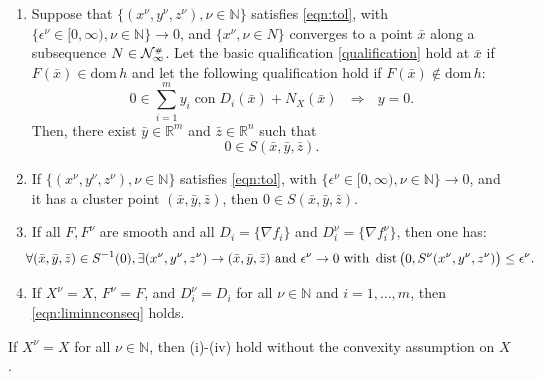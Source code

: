 \documentclass[smallextended,envcountsect]{svjour3}
\newcommand{\dom}[1]{\mathrm{dom}\, #1} %
\newcommand{\nats}{\mathbb{N}}
\newcommand{\reals}{\mathbb{R}}
\newcommand{\cN}{{\cal N}}
\newcommand{\grill}{{\scriptscriptstyle\#}}
\DeclareMathOperator{\con}{con}
\DeclareMathOperator{\dist}{dist}
\begin{document}
\begin{theorem}
\begin{enumerate}[label=(\roman*), start=1]
\item  Suppose that $\{(x^\nu,y^\nu,z^\nu), \nu\in\nats\}$ satisfies \eqref{eqn:tol}, with $\{\epsilon^\nu \in [0,\infty), \nu\in\nats\} \to 0$, and $\{x^\nu, \nu\in N\}$ converges to a point $\bar x$ along a subsequence $N\in \cN_\infty^\grill$. Let the basic qualification \eqref{qualification} hold at $\bar x$ if $F(\bar x) \in \dom h$ and let the following qualification hold if $F(\bar x) \not\in \dom h$: 
\begin{equation}\label{qualificationInfeas}
0 \in \sum_{i=1}^m y_i \con D_i(\bar x) + N_X(\bar x)~~~\Longrightarrow~~~ y=0.
\end{equation}
Then, there exist $\bar y\in\reals^m$ and $\bar z\in \reals^n$ such that 
\[
0 \in S(\bar x, \bar y, \bar z).
\]

\item If $\{(x^\nu,y^\nu,z^\nu), \nu\in\nats\}$ satisfies \eqref{eqn:tol}, with $\{\epsilon^\nu \in [0,\infty), \nu\in\nats\} \to 0$, and it has a cluster point $(\bar x, \bar y, \bar z)$, then $0 \in S(\bar x, \bar y, \bar z)$. 


\item  If all $F,F^\nu$ are smooth and all $D_i = \{\nabla f_i\}$ and $D^\nu_i= \{\nabla f_i^\nu\}$, then one has: 
\begin{equation}\label{eqn:liminnconseq}
\hspace{-0.2cm}\forall  (\bar x, \bar y, \bar z) \in S^{-1}(0), \exists (x^\nu,y^\nu,z^\nu) \to (\bar x, \bar y, \bar z) \mbox{ and } \epsilon^\nu\to 0 \mbox{ with } \dist\big(0, S^\nu(x^\nu,y^\nu,z^\nu)\big) \leq \epsilon^\nu. 
\end{equation}

\item If $X^\nu = X$, $F^\nu = F$, and $D_i^\nu = D_i$ for all $\nu\in\nats$ and $i = 1, \dots, m$, then \eqref{eqn:liminnconseq} holds.  
%
\end{enumerate}
If $X^\nu = X$ for all $\nu\in \nats$, then (i)-(iv) hold without the convexity assumption on $X$.   
 
\end{theorem}  
\end{document}
